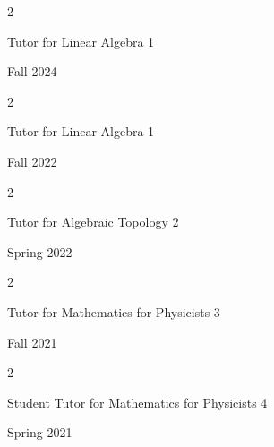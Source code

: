 \documentclass[10pt, letterpaper]{article}
\newenvironment{twocolentry}[2][]{
    \onecolentry
    \def\secondColumn{#2}
    \setcolumnwidth{\fill, 4.5 cm}
    \begin{paracol}{2}
}{
    \switchcolumn \raggedleft \secondColumn
    \end{paracol}
    \endonecolentry
} %
\begin{document}
\vspace{0.2cm}

\begin{twocolentry}{

    Fall 2024
           
        }
           Tutor for Linear Algebra 1
            
           
        \end{twocolentry}
        
 \vspace{0.2cm}

 \begin{twocolentry}{

    Fall 2022
           
        }
           Tutor for Linear Algebra 1
            
           
        \end{twocolentry}
        
 \vspace{0.2cm}

 \begin{twocolentry}{

    Spring 2022
           
        }
         Tutor for Algebraic Topology 2
            
           
        \end{twocolentry}
        
 \vspace{0.2cm}

 \begin{twocolentry}{

    Fall 2021
           
        }
           Tutor for Mathematics for Physicists 3 
            
           
        \end{twocolentry}
        
 \vspace{0.2cm}

 \begin{twocolentry}{

    Spring 2021
           
        }
           Student Tutor for Mathematics for Physicists 4
            
           
        \end{twocolentry}
        
 \vspace{0.2cm}
\end{document}
